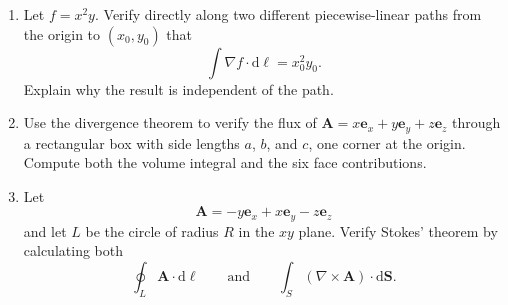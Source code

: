 \begin{enumerate}
    \item\label{ex:gradient-line-integral} Let $f=x^2y$. Verify directly along two different piecewise-linear paths from the origin to $(x_0,y_0)$ that
    \begin{equation*}
        \int\nabla f\cdot\mathrm{d}\boldsymbol{\ell}=x_0^2y_0.
    \end{equation*}
    Explain why the result is independent of the path.

    \item\label{ex:divergence-theorem} Use the divergence theorem to verify the flux of
    $\mathbf{A}=x\mathbf{e}_x+y\mathbf{e}_y+z\mathbf{e}_z$ through a rectangular box with side lengths $a$, $b$, and $c$, one corner at the origin. Compute both the volume integral and the six face contributions.

    \item\label{ex:stokes-theorem} Let
    \begin{equation*}
        \mathbf{A}=-y\mathbf{e}_x+x\mathbf{e}_y-z\mathbf{e}_z
    \end{equation*}
    and let $L$ be the circle of radius $R$ in the $xy$ plane. Verify Stokes' theorem by calculating both
    \begin{equation*}
        \oint_L\mathbf{A}\cdot\mathrm{d}\boldsymbol{\ell}
        \qquad\text{and}\qquad
        \int_S(\nabla\times\mathbf{A})\cdot\mathrm{d}\mathbf{S}.
    \end{equation*}
\end{enumerate}
